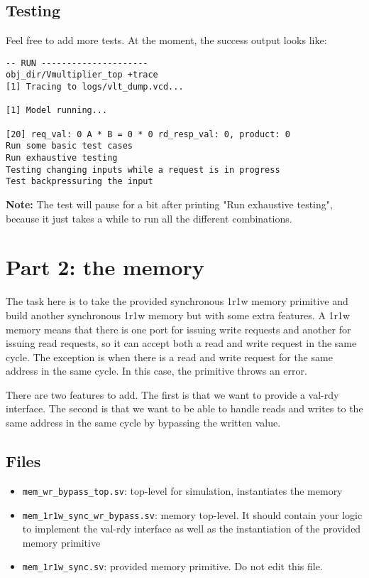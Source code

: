 \documentclass{article}
\begin{document}
\subsection*{Testing}
Feel free to add more tests. At the moment, the success output looks like:
\begin{verbatim}
-- RUN ---------------------
obj_dir/Vmultiplier_top +trace
[1] Tracing to logs/vlt_dump.vcd...

[1] Model running...

[20] req_val: 0 A * B = 0 * 0 rd_resp_val: 0, product: 0
Run some basic test cases
Run exhaustive testing
Testing changing inputs while a request is in progress
Test backpressuring the input
\end{verbatim}
\textbf{Note:} The test will pause for a bit after printing "Run exhaustive
testing", because it just takes a while to run all the different combinations.

\section*{Part 2: the memory}
The task here is to take the provided synchronous 1r1w memory primitive and
build another synchronous 1r1w memory but with some extra features. A 1r1w
memory means that there is one port for issuing write requests and another for
issuing read requests, so it can accept both a read and write request in the
same cycle. The exception is when there is a read and write request for the same
address in the same cycle. In this case, the primitive throws an error.

There are two features to add. The first is that we want to provide a val-rdy
interface. The second is that we want to be able to handle reads and writes to
the same address in the same cycle by bypassing the written value.

\subsection*{Files}
\begin{itemize}
    \item \texttt{mem\_wr\_bypass\_top.sv}: top-level for simulation,
    instantiates the memory
    \item \texttt{mem\_1r1w\_sync\_wr\_bypass.sv}: memory top-level. It should
    contain your logic to implement the val-rdy interface as well as the
    instantiation of the provided memory primitive
    \item \texttt{mem\_1r1w\_sync.sv}: provided memory primitive. Do not edit
    this file.
\end{itemize}
\end{document}
